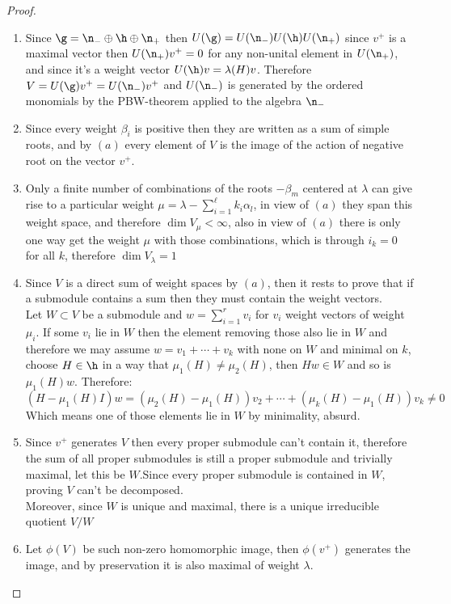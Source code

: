 \begin{proof}
\begin{enumerate}[label=(\alph*)]
	\item Since $\g=\n_{-} \oplus \h \oplus \n_{+}$ then $U(\g) = U(\n_-)U(\h)U(\n_{+})$ since $v^+$ is a maximal vector then $U(\n_{+})v^+=0$ for any non-unital element in $U(\n_{+})$, and since it's a weight vector $U(\h)v = \lambda(H)v$. Therefore $V=U(\g)v^+ = U(\n_-)v^+$ and $U(\n_-)$ is generated by the ordered monomials by the PBW-theorem applied to the algebra $\n_-$ 
	\item Since every weight $\beta_i$ is positive then they are written as a sum of simple roots, and by $(a)$ every element of $V$ is the image of the action of negative root on the vector $v^+$.
	\item Only a finite number of combinations of the roots $-\beta_m$ centered at $\lambda$ can give rise to a particular weight $\mu = \lambda - \sum_{i=1}^\ell k_i \alpha_l$, in view of $(a)$ they span this weight space, and therefore $\dim V_\mu < \infty$, also in view of $(a)$ there is only one way get the weight $\mu$ with those combinations, which is through $i_k=0$ for all $k$, therefore $\dim V_\lambda = 1$
	\item Since $V$ is a direct sum of weight spaces by $(a)$, then it rests to prove that if a submodule contains a sum then they must contain the weight vectors.\\
	Let $W \subset V$ be a submodule and $w = \sum_{i=1}^r v_i$ for $v_i$ weight vectors of weight $\mu_i$. If some $v_i$ lie in $W$ then the element removing those also lie in $W$ and therefore we may assume $w = v_1 + \cdots + v_k$ with none on $W$ and minimal on $k$, choose $H \in \h$ in a way that $\mu_1(H) \not= \mu_2(H)$, then $Hw \in W$ and so is $\mu_1(H)w$. Therefore:
	$$(H - \mu_1(H)I)w = (\mu_2(H)-\mu_1(H))v_2 + \cdots + (\mu_k(H)-\mu_1(H))v_k \not=0 $$
	Which means one of those elements lie in $W$ by minimality, absurd.
	\item  Since $v^+$ generates $V$ then every proper submodule can't contain it, therefore the sum of all proper submodules is still a proper submodule and trivially maximal, let this be $W$.Since every proper submodule is contained in $W$, proving $V$ can't be decomposed.\\
	Moreover, since $W$ is unique and maximal, there is a unique irreducible quotient $V/W$
	\item Let $\phi(V)$ be such non-zero homomorphic image, then $\phi(v^+)$ generates the image, and by preservation it is also maximal of weight $\lambda$.
\end{enumerate}
\end{proof}
